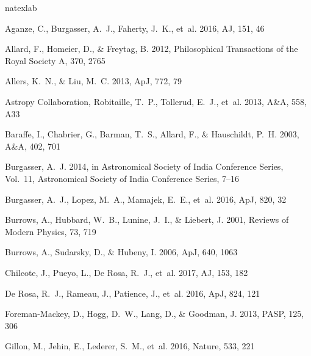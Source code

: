 \documentclass[usenatbib]{basi}
\newcommand\aj{{AJ}}%
\newcommand\apj{{ApJ}}%
\newcommand\aap{{A\&A}}%
\newcommand\pasp{{PASP}}%
\newcommand\nat{{Nature}}%
\begin{document}
\begin{thebibliography}{}
\expandafter\ifx\csname natexlab\endcsname\relax\def\natexlab#1{#1}\fi

{Aganze}, C., {Burgasser}, A.~J., {Faherty}, J.~K., {et~al.} 2016, \aj, 151, 46

{Allard}, F., {Homeier}, D., \& {Freytag}, B. 2012, Philosophical Transactions
  of the Royal Society A, 370, 2765

{Allers}, K.~N., \& {Liu}, M.~C. 2013, \apj, 772, 79

{Astropy Collaboration}, {Robitaille}, T.~P., {Tollerud}, E.~J., {et~al.} 2013,
  \aap, 558, A33

{Baraffe}, I., {Chabrier}, G., {Barman}, T.~S., {Allard}, F., \& {Hauschildt},
  P.~H. 2003, \aap, 402, 701

{Burgasser}, A.~J. 2014, in Astronomical Society of India Conference Series,
  Vol.~11, Astronomical Society of India Conference Series, 7--16

{Burgasser}, A.~J., {Lopez}, M.~A., {Mamajek}, E.~E., {et~al.} 2016, \apj, 820,
  32

{Burrows}, A., {Hubbard}, W.~B., {Lunine}, J.~I., \& {Liebert}, J. 2001,
  Reviews of Modern Physics, 73, 719

{Burrows}, A., {Sudarsky}, D., \& {Hubeny}, I. 2006, \apj, 640, 1063

{Chilcote}, J., {Pueyo}, L., {De Rosa}, R.~J., {et~al.} 2017, \aj, 153, 182

{De Rosa}, R.~J., {Rameau}, J., {Patience}, J., {et~al.} 2016, \apj, 824, 121

{Foreman-Mackey}, D., {Hogg}, D.~W., {Lang}, D., \& {Goodman}, J. 2013, \pasp,
  125, 306

{Gillon}, M., {Jehin}, E., {Lederer}, S.~M., {et~al.} 2016, \nat, 533, 221


\end{thebibliography}
\end{document}

